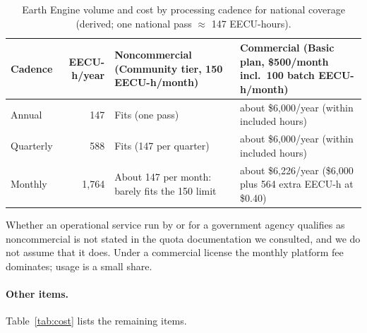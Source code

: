\documentclass{article}
\begin{document}
\begin{table}[H]
\centering
\caption{Earth Engine volume and cost by processing cadence for national
coverage (derived; one national pass $\approx$ 147 EECU-hours).}
\label{tab:ee}
\small
\begin{tabular}{lrp{4.1cm}p{4.3cm}}
\toprule
Cadence & EECU-h/year & Noncommercial (Community tier, 150 EECU-h/month) & Commercial (Basic plan, \$500/month incl.\ 100 batch EECU-h/month) \\
\midrule
Annual    & 147   & Fits (one pass)                  & about \$6{,}000/year (within included hours) \\
Quarterly & 588   & Fits (147 per quarter)           & about \$6{,}000/year (within included hours) \\
Monthly   & 1{,}764 & About 147 per month: barely fits the 150 limit & about \$6{,}226/year (\$6{,}000 plus 564 extra EECU-h at \$0.40) \\
\bottomrule
\end{tabular}
\end{table}

Whether an operational service run by or for a government agency qualifies as
noncommercial is not stated in the quota documentation we consulted, and we do
not assume that it does. Under a commercial license the monthly platform fee
dominates; usage is a small share.

\paragraph{Other items.}
Table~\ref{tab:cost} lists the remaining items.
\end{document}
